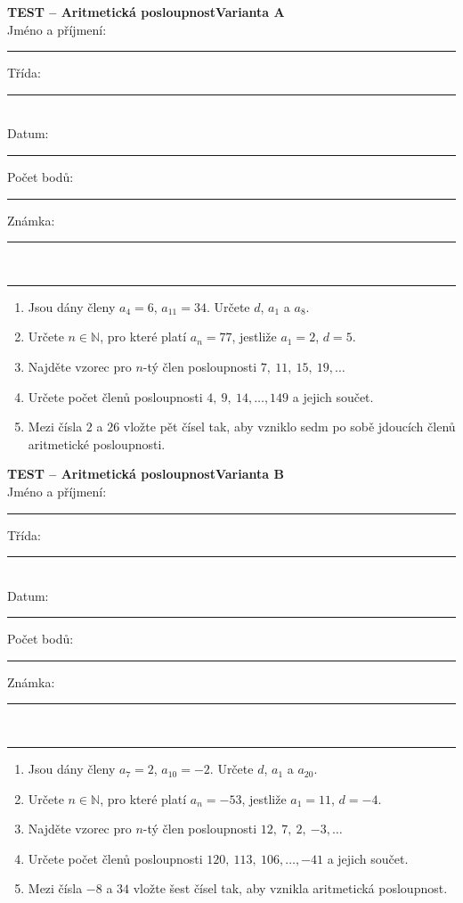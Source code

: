 \documentclass[a4paper,10pt,landscape]{article}
\newcommand{\TestTitle}{Aritmetická posloupnost}
\newcommand{\TestHeader}[1]{%
    {\bfseries TEST -- \TestTitle}\hfill{\bfseries Varianta #1}\\[2mm]
    Jméno a příjmení: \rule{4.5cm}{0.4pt}\hfill Třída: \rule{1.5cm}{0.4pt}\\[2mm]
    Datum: \rule{2.4cm}{0.4pt}\hfill Počet bodů: \rule{1.4cm}{0.4pt}\hfill Známka: \rule{1.4cm}{0.4pt}\\[1mm]
    \hrule\vspace{3mm}
}
\newcommand{\AnswerSpace}[1]{\vspace{#1}}
\begin{document}
\noindent
\begin{minipage}[t]{0.48\textwidth}
    \small
    \TestHeader{A}

    \begin{enumerate}
        \item Jsou dány členy $a_4=6$, $a_{11}=34$.
        Určete $d$, $a_1$ a $a_8$.
        \AnswerSpace{26mm}

        \item Určete $n\in\mathbb{N}$, pro které platí $a_n=77$,
        jestliže $a_1=2$, $d=5$.
        \AnswerSpace{22mm}

        \item Najděte vzorec pro $n$-tý člen posloupnosti
        $7,\ 11,\ 15,\ 19,\ldots$
        \AnswerSpace{21mm}

        \item Určete počet členů posloupnosti $4,\ 9,\ 14,\ldots,149$
        a jejich součet.
        \AnswerSpace{27mm}

        \item Mezi čísla $2$ a $26$ vložte pět čísel tak, aby vzniklo sedm
        po sobě jdoucích členů aritmetické posloupnosti.
        \AnswerSpace{24mm}
    \end{enumerate}
\end{minipage}%
\hfill\vrule width 0.4pt\hfill
\begin{minipage}[t]{0.48\textwidth}
    \small
    \TestHeader{B}

    \begin{enumerate}
        \item Jsou dány členy $a_7=2$, $a_{10}=-2$.
        Určete $d$, $a_1$ a $a_{20}$.
        \AnswerSpace{26mm}

        \item Určete $n\in\mathbb{N}$, pro které platí $a_n=-53$,
        jestliže $a_1=11$, $d=-4$.
        \AnswerSpace{22mm}

        \item Najděte vzorec pro $n$-tý člen posloupnosti
        $12,\ 7,\ 2,\ {-3},\ldots$
        \AnswerSpace{21mm}

        \item Určete počet členů posloupnosti $120,\ 113,\ 106,\ldots,-41$
        a jejich součet.
        \AnswerSpace{27mm}

        \item Mezi čísla $-8$ a $34$ vložte šest čísel tak, aby vznikla
        aritmetická posloupnost.
        \AnswerSpace{24mm}
    \end{enumerate}
\end{minipage}
\end{document}

